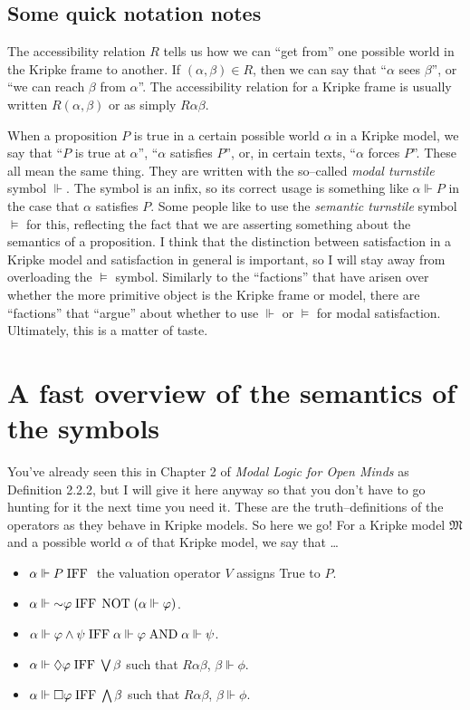\subsection*{Some quick notation notes}


The accessibility relation $R$ tells us how we can ``get from'' one possible world in the Kripke frame to another. If 
$(\alpha, \beta) \in R$, then we can say that ``$\alpha$ sees $\beta$'', or ``we can reach $\beta$ from $\alpha$''. The accessibility
relation for a Kripke frame is usually written $R(\alpha, \beta)$ or as simply $R \alpha \beta$.

When a proposition $P$ is true in a certain possible world $\alpha$ in a Kripke model, we say that ``$P$ is true at $\alpha$'',
``$\alpha$ satisfies $P$'', or, in certain texts, ``$\alpha$ forces $P$''. These all mean the same thing. They are written
with the so--called \emph{modal turnstile} symbol $\Vdash$. The symbol is an infix, so its correct usage is something like
$\alpha \Vdash P$ in the case that $\alpha$ satisfies $P$. Some people like to use the \emph{semantic turnstile} symbol 
$\models$ for this, reflecting the fact that we are asserting something about the semantics of a proposition. I think that the
distinction between satisfaction in a Kripke model and satisfaction in general is important, so I will stay away from overloading
the $\models$ symbol. Similarly to the ``factions'' that have arisen over whether the more primitive object is the Kripke
frame or model, there are ``factions'' that ``argue'' about whether to use $\Vdash$ or $\models$ for modal satisfaction.
Ultimately, this is a matter of taste.

\section{A fast overview of the semantics of the symbols}
You've already seen this in Chapter 2 of \emph{Modal Logic for Open Minds} as Definition 2.2.2, but I will give it here anyway
so that you don't have to go hunting for it the next time you need it. These are the truth--definitions of the operators
as they behave in Kripke models. So here we go! For a Kripke model $\mathfrak{M}$ and a possible world $\alpha$ of that 
Kripke model, we say that \dots
\begin{itemize}
    \item $\alpha \Vdash P \mathord{\;\mathrm{IFF}\;}$ the valuation operator $V$ assigns True to $P$. 
    \item $\alpha \Vdash \mathord{\sim} \varphi \mathord{\;\mathrm{IFF}\;} \, \mathrm{NOT} \; (\alpha \Vdash \varphi)$.
    \item $\alpha \Vdash \varphi \wedge \psi \mathord{\;\mathrm{IFF}\;} \alpha \Vdash \varphi \mathord{\;\mathrm{AND}\;} \alpha \Vdash \psi$.
    \item $\alpha \Vdash \lozenge \varphi \mathord{\;\mathrm{IFF}\;} \bigvee \beta$ such that $R \alpha \beta$, $\beta \Vdash \phi$.
    \item $\alpha \Vdash \square \varphi \mathord{\;\mathrm{IFF}\;} \bigwedge \beta$ such that $R \alpha \beta$, $\beta \Vdash \phi$.
\end{itemize}

